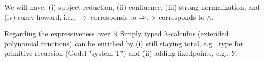 


\begin{remark}
    We will have:  (i) subject reduction, (ii) confluence, (iii) strong normalization, and (iv) curry-howard, i.e., $\to$ corresponds to $\Rightarrow$, $\times$ corresponds to $\land$.
\end{remark}

\begin{remark}
    Regarding the expressiveness over $\mathbb{N}$
    Simply typed $\lambda$-calculus (extended polynomial functions) can be enriched by (i) still staying total, e.g., type for primitive recursion (Godel "system T") and (ii) adding fixedpoints, e.g., $Y$.
    
\end{remark}


